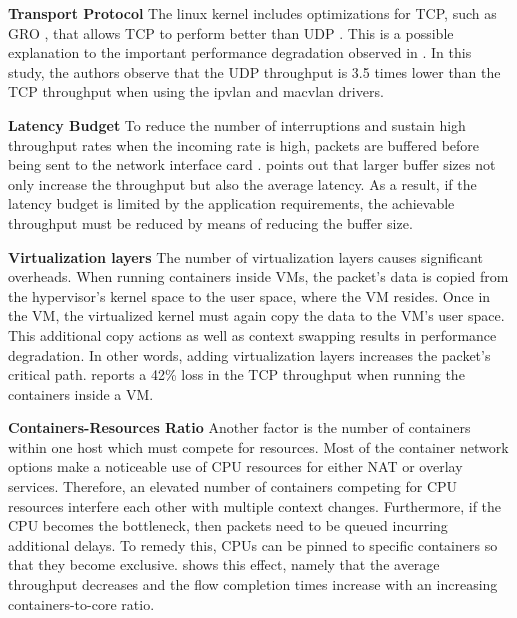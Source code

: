 \documentclass[conference]{IEEEtran}
\begin{document}
\noindent\textbf{Transport Protocol}\hspace{0.2cm} 
The linux kernel includes optimizations for TCP, such as GRO \cite{GRO}, that allows TCP to perform better than UDP \cite{HotConNet_17:Zhao}. This is a possible explanation to the important performance degradation observed in \cite{NOMS_2016:Claasen}. In this study, the authors observe that the UDP throughput is 3.5 times lower than the TCP throughput when using the ipvlan and macvlan drivers.

\noindent\textbf{Latency Budget}\hspace{0.2cm}
To reduce the number of interruptions and sustain high throughput rates when the incoming rate is high, packets are buffered before being sent to the network interface card \cite{DEBS_20:Stylianopoulos}. \cite{ANCS:Gallenmuller} points out that larger buffer sizes not only increase the throughput but also the average latency. As a result, if the latency budget is limited by the application requirements, the achievable throughput must be reduced by means of reducing the buffer size.

\noindent\textbf{Virtualization layers}\hspace{0.2cm}
The number of virtualization layers causes significant overheads. When running containers inside VMs, the packet's data is copied from the hypervisor's kernel space to the user space, where the VM resides. Once in the VM, the virtualized kernel must again copy the data to the VM’s user space. This additional copy actions as well as context swapping results in performance degradation. In other words, adding virtualization layers increases the packet's critical path. \cite{IEEE_INFOCOM_2018:K. Suo} reports a 42\% loss in the TCP throughput when running the containers inside a VM.

\noindent\textbf{Containers-Resources Ratio}\hspace{0.2cm}
Another factor is the number of containers within one host which must compete for resources. Most of the container network options make a noticeable use of CPU resources for either NAT or overlay services. Therefore, an elevated number of containers competing for CPU resources interfere each other with multiple context changes. Furthermore, if the CPU becomes the bottleneck, then packets need to be queued incurring additional delays. To remedy this, CPUs can be pinned to specific containers so that they become exclusive. \cite{Boeira:2021} shows this effect, namely that the average throughput decreases and the flow completion times increase with an increasing containers-to-core ratio. 
\end{document}
